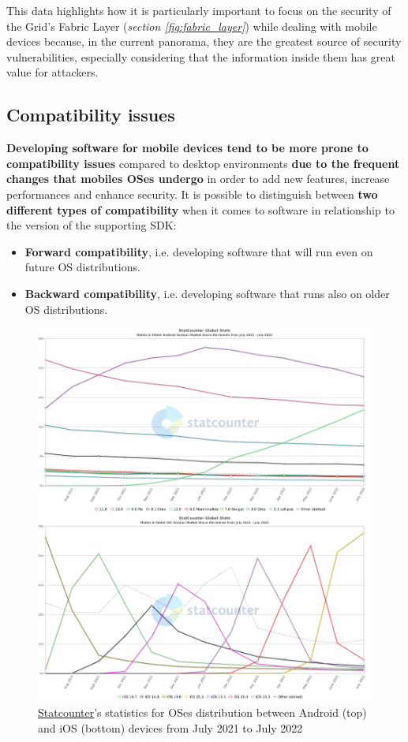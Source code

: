 This data highlights how it is particularly important to focus on the security of the Grid's Fabric Layer (\textit{section \ref{fig:fabric_layer}}) while dealing with mobile devices because, in the current panorama, they are the greatest source of security vulnerabilities, especially considering that the information inside them has great value for attackers.

\subsection{Compatibility issues}
\textbf{Developing software for mobile devices tend to be more prone to compatibility issues} compared to desktop environments \textbf{due to the frequent changes that mobiles OSes undergo} in order to add new features, increase performances and enhance security. It is possible to distinguish between \textbf{two different types of compatibility} when it comes to software in relationship to the version of the supporting SDK:

\begin{itemize}
    \item \textbf{Forward compatibility}, i.e. developing software that will run even on future OS distributions.
    \item \textbf{Backward compatibility}, i.e. developing software that runs also on older OS distributions.
\end{itemize}

\begin{figure}[!ht]
    \centering
    \includegraphics[scale=0.4]{document/chapters/chapter_3/images/stat_counter_ios_android.png}
    \caption{\href{https://gs.statcounter.com/}{Statcounter}'s statistics for OSes distribution between Android (top) and iOS (bottom) devices from July 2021 to July 2022}
    \label{fig:stat_counter_ios_android}
\end{figure}

